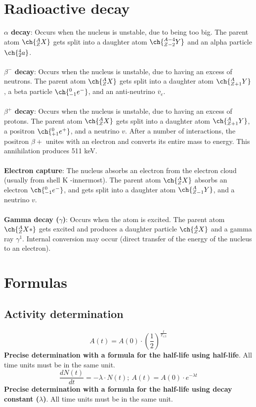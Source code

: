 \chapter{Radioactive decay}
\textbf{$\alpha$ decay}: Occurs when the nucleus is unstable, due to being too big. The parent atom $\ch{^{A}_{Z}X}$ gets split into a daughter atom $\ch{^{A-4}_{Z-2}Y}$ and an alpha particle $\ch{^{4}_{2}a}$.\\\\
\textbf{$\beta^{-}$ decay}: Occurs when the nucleus is unstable, due to having an excess of neutrons. The parent atom $\ch{^{A}_{Z}X}$ gets split into a daughter atom $\ch{^{A}_{Z+1}Y}$, a beta particle $\ch{^{0}_{-1}e^{-}}$, and an anti-neutrino $\overline{v}_e$.\\\\
\textbf{$\beta^{+}$ decay}: Occurs when the nucleus is unstable, due to having an excess of protons. The parent atom $\ch{^{A}_{Z}X}$ gets split into a daughter atom $\ch{^{A}_{Z+1}Y}$, a positron $\ch{^{0}_{+1}e^{+}}$, and a neutrino $v$. After a number of interactions, the positron $\beta{+}$ unites with an electron and converts its entire mass to energy. This annihilation produces 511 keV.\\\\
\textbf{Electron capture}: The nucleus absorbs an electron from the electron cloud (usually from shell K -innermost). The parent atom $\ch{^{A}_{Z}X}$ absorbs an electron $\ch{^{0}_{-1}e^{-}}$, and gets split into a daughter atom $\ch{^{A}_{Z-1}Y}$, and a neutrino $v$.\\\\
\textbf{Gamma decay ($\gamma$)}: Occurs when the atom is excited. The parent atom $\ch{^{A}_{Z}X*}$ gets excited and produces a daughter particle $\ch{^{A}_{Z}X}$ and a gamma ray $\gamma^{1}$. Internal conversion may occur (direct transfer of the energy of the nucleus to an electron).
\chapter{Formulas}
\section{Activity determination}
\[A(t) = A(0) \cdot (\frac{1}{2})^{\frac{t}{T_{1/2}}}\]
\textbf{Precise determination with a formula for the half-life using half-life}. All time units must be in the same unit.\\
\[\frac{dN(t)}{dt}=-\lambda\cdot N(t);\ A(t) = A(0)\cdot e^{-\lambda t}\]
\textbf{Precise determination with a formula for the half-life using decay constant ($\lambda$)}. All time units must be in the same unit.\\

